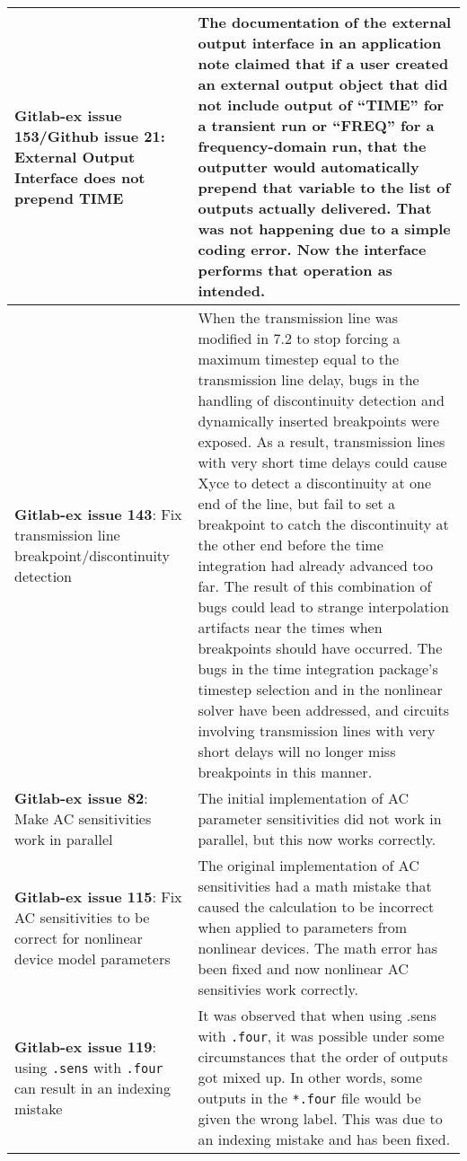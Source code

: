 {\begin{longtable}[h] {>{\raggedright\small}m{2in}|>{\raggedright\let\\\tabularnewline\small}m{3.5in}}
\textbf{Gitlab-ex issue 153/Github issue 21}: External Output Interface does not prepend TIME &
The documentation of the external output interface in an application
note claimed that if a user created an external output object that did
not include output of ``TIME'' for a transient run or ``FREQ'' for a
frequency-domain run, that the outputter would automatically prepend
that variable to the list of outputs actually delivered.  That was not
happening due to a simple coding error.  Now the interface performs
that operation as intended. \\ \hline

\textbf{Gitlab-ex issue 143}: Fix transmission line breakpoint/discontinuity detection &
When the transmission line was modified in \Xyce{} 7.2 to stop forcing
a maximum timestep equal to the transmission line delay, bugs in the
handling of discontinuity detection and dynamically inserted
breakpoints were exposed.  As a result, transmission lines with very
short time delays could cause Xyce to detect a discontinuity at one
end of the line, but fail to set a breakpoint to catch the
discontinuity at the other end before the time integration had already
advanced too far.  The result of this combination of bugs could lead
to strange interpolation artifacts near the times when breakpoints
should have occurred.  The bugs in the time integration package's
timestep selection and in the nonlinear solver have been addressed,
and circuits involving transmission lines with very short delays will
no longer miss breakpoints in this manner. \\ \hline

\textbf{Gitlab-ex issue 82}:  Make AC sensitivities work in parallel &
The initial implementation of AC parameter sensitivities did not work
in parallel, but this now works correctly.
\\ \hline

\textbf{Gitlab-ex issue 115}:  Fix AC sensitivities to be correct for nonlinear
device model parameters & The original implementation of AC
sensitivities had a math mistake that caused the calculation to be
incorrect when applied to parameters from nonlinear devices.  The math
error has been fixed and now nonlinear AC sensitivies work correctly.
\\ \hline

\textbf{Gitlab-ex issue 119}:  using \texttt{.sens} with \texttt{.four} can result in an indexing mistake &
It was observed that when using .sens with \texttt{.four}, it was
possible under some circumstances that the order of outputs got
mixed up.  In other words, some outputs in the \texttt{*.four} file
would be given the wrong label.  This was due to an indexing mistake
and has been fixed.
\\ \hline


\end{longtable}}
